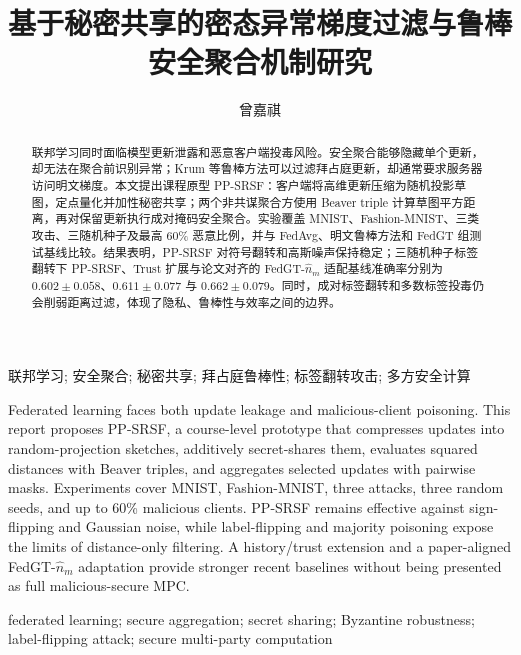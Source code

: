 \documentclass[final]{jcr}
\begin{document}
\setcounter{page}{1}


\begin{frontmatter}
  \title{基于秘密共享的密态异常梯度过滤与鲁棒安全聚合机制研究}

  \author[1]{曾嘉祺}

  \address[1]{广东外语外贸大学 信息科学与技术学院（网络空间安全学院）, 广州 510006; E-mail: 20251010015@mail.gdufs.edu.cn}

  \begin{abstract}
联邦学习同时面临模型更新泄露和恶意客户端投毒风险。安全聚合能够隐藏单个更新，却无法在聚合前识别异常；Krum 等鲁棒方法可以过滤拜占庭更新，却通常要求服务器访问明文梯度。本文提出课程原型 PP-SRSF：客户端将高维更新压缩为随机投影草图，定点量化并加性秘密共享；两个非共谋聚合方使用 Beaver triple 计算草图平方距离，再对保留更新执行成对掩码安全聚合。实验覆盖 MNIST、Fashion-MNIST、三类攻击、三随机种子及最高 60\% 恶意比例，并与 FedAvg、明文鲁棒方法和 FedGT 组测试基线比较。结果表明，PP-SRSF 对符号翻转和高斯噪声保持稳定；三随机种子标签翻转下 PP-SRSF、Trust 扩展与论文对齐的 FedGT-$\hat n_m$ 适配基线准确率分别为 $0.602\pm0.058$、$0.611\pm0.077$ 与 $0.662\pm0.079$。同时，成对标签翻转和多数标签投毒仍会削弱距离过滤，体现了隐私、鲁棒性与效率之间的边界。
  \end{abstract}

  \begin{keywords}
联邦学习; 安全聚合; 秘密共享; 拜占庭鲁棒性; 标签翻转攻击; 多方安全计算
  \end{keywords}

  \begin{eabstract}
Federated learning faces both update leakage and malicious-client poisoning. This report proposes PP-SRSF, a course-level prototype that compresses updates into random-projection sketches, additively secret-shares them, evaluates squared distances with Beaver triples, and aggregates selected updates with pairwise masks. Experiments cover MNIST, Fashion-MNIST, three attacks, three random seeds, and up to 60\% malicious clients. PP-SRSF remains effective against sign-flipping and Gaussian noise, while label-flipping and majority poisoning expose the limits of distance-only filtering. A history/trust extension and a paper-aligned FedGT-$\hat n_m$ adaptation provide stronger recent baselines without being presented as full malicious-secure MPC.
  \end{eabstract}

  \begin{ekeywords}
federated learning; secure aggregation; secret sharing; Byzantine robustness; label-flipping attack; secure multi-party computation
  \end{ekeywords}
\end{frontmatter}
\end{document}

